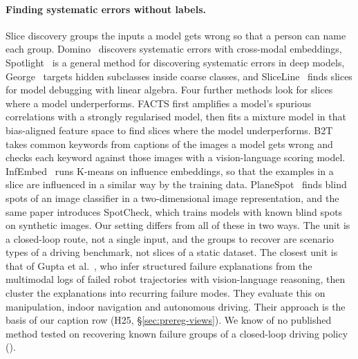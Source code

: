\paragraph{Finding systematic errors without labels.}
Slice discovery groups the inputs a model gets wrong so that a person can name
each group. Domino~\cite{eyuboglu2022domino} discovers systematic errors with
cross-modal embeddings, Spotlight~\cite{deon2022spotlight} is a general method
for discovering systematic errors in deep models, George~\cite{sohoni2020george}
targets hidden subclasses inside coarse classes, and
SliceLine~\cite{sagadeeva2021sliceline} finds slices for model debugging with
linear algebra. Four further methods look for slices where a model
underperforms. FACTS
\cite{yenamandra2023facts} first amplifies a model's spurious correlations with a
strongly regularised model, then fits a mixture model in that bias-aligned
feature space to find slices where the model underperforms. B2T
\cite{kim2024b2t} takes common keywords from captions of the images a model gets
wrong and checks each keyword against those images with a vision-language scoring
model. InfEmbed~\cite{wang2023infembed} runs K-means on influence embeddings, so
that the examples in a slice are influenced in a similar way by the training
data. PlaneSpot~\cite{plumb2023planespot} finds blind spots of an image classifier
in a two-dimensional image representation, and the same paper introduces
SpotCheck, which trains models with known blind spots on synthetic images. Our
setting differs from all of these in two ways. The unit is a closed-loop route,
not a single input, and the groups to recover are scenario types of a driving
benchmark, not slices of a static dataset. The closest unit is that of Gupta
et al.~\cite{gupta2025caption}, who infer structured failure explanations from
the multimodal logs of failed robot trajectories with vision-language reasoning,
then cluster the explanations into recurring failure modes. They evaluate this on
manipulation, indoor navigation and autonomous driving. Their approach is the
basis of our caption row (H25, \S\ref{sec:prereg-views}). We know of no
published method tested on recovering known failure groups of a closed-loop
driving policy ().

